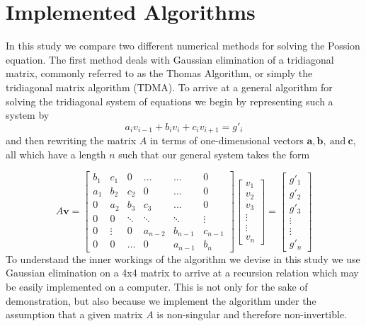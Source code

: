 \documentclass[a4paper, english]{amsart} %
\begin{document}
\section{Implemented Algorithms}
In this study we compare two different numerical methods for solving the Possion equation. The first method deals with Gaussian elimination of a tridiagonal matrix, commonly referred to as the Thomas Algorithm, or simply the tridiagonal matrix algorithm (TDMA). To arrive at a general algorithm for solving the tridiagonal system of equations we begin by representing such a system by
$$
a_iv_{i-1} + b_iv_i + c_iv_{i+1} = g'_i
$$
and then rewriting the matrix $A$ in terms of one-dimensional vectors $\mathbf{a}, \mathbf{b}, \ \text{and}\ \mathbf{c}$, all which have a length $n$ such that our general system takes the form

\begin{equation*}
A\mathbf{v} = 
\begin{bmatrix}
b_1 & c_1 & 0 & \hdots & \hdots & 0\\
a_1 & b_2 & c_2 & 0 & \hdots & 0 \\
0 & a_2 & b_3 & c_3 & \hdots & 0 \\
0  & 0 & \ddots & \ddots & \ddots & \vdots \\
0 & \vdots & 0 & a_{n-2} & b_{n-1} & c_{n-1} \\
0 & 0 & \hdots & 0 & a_{n-1} & b_n
\end{bmatrix}
\begin{bmatrix}
v_1 \\
v_2 \\
v_3\\
\vdots \\
\vdots \\
v_n
\end{bmatrix} = 
\begin{bmatrix}
g'_1\\g'_2\\g'_3\\\vdots\\\vdots\\g'_n
\end{bmatrix}
\end{equation*}
To understand the inner workings of the algorithm we devise in this study we use Gaussian elimination on a 4x4 matrix to arrive at a recursion relation which may be easily implemented on a computer. This is not only for the sake of demonstration, but also because we implement the algorithm under the assumption that a given matrix $A$ is non-singular and therefore non-invertible. 
\end{document}

